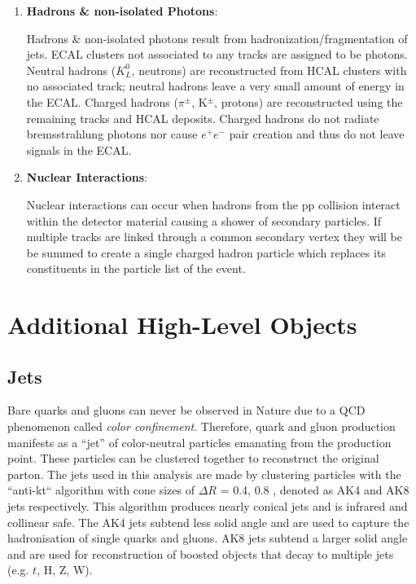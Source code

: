\begin{enumerate}
\item \textbf{Hadrons \& non-isolated Photons}:

Hadrons \& non-isolated photons result from hadronization/fragmentation of jets. ECAL clusters not associated to any tracks are assigned to be photons. Neutral hadrons ($K^{0}_{L}$, neutrons) are reconstructed from HCAL clusters with no associated track; neutral hadrons leave a very small amount of energy in the ECAL. Charged hadrons ($\pi^{\pm}$, K$^{\pm}$, protons) are reconstructed using the remaining tracks and HCAL deposits. Charged hadrons do not radiate bremsstrahlung photons nor cause $e^{+}e^{-}$ pair creation and thus do not leave signals in the ECAL.

\item \textbf{Nuclear Interactions}:

Nuclear interactions can occur when hadrons from the pp collision interact within the detector material causing a shower of secondary particles. If multiple tracks are linked through a common secondary vertex they will be be summed to create a single charged hadron particle which replaces its constituents in the particle list of the event.

\end{enumerate}

\section{Additional High-Level Objects}

\subsection{Jets}

Bare quarks and gluons can never be observed in Nature due to a QCD phenomenon called \textit{color confinement}. Therefore, quark and gluon production manifests as a ``jet'' of color-neutral particles emanating from the production point. These particles can be clustered together to reconstruct the original parton. The jets used in this analysis are made by clustering particles with the ``anti-kt`` algorithm with cone sizes of $\Delta R$ = 0.4, 0.8 \cite{1126-6708-2008-04-063}, denoted as AK4 and AK8 jets respectively. This algorithm produces nearly conical jets and is infrared and collinear safe. The AK4 jets subtend less solid angle and are used to capture the hadronisation of single quarks and gluons. AK8 jets subtend a larger solid angle and are used for reconstruction of boosted objects that decay to multiple jets (e.g. $t$, H, Z, W).

